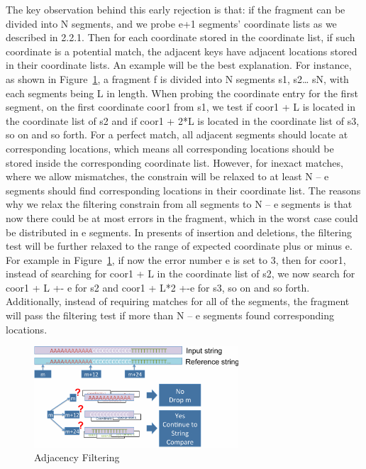 The key observation behind this early rejection is that: if the fragment can be
divided into N segments, and we probe e+1 segments’ coordinate lists as we
described in 2.2.1. Then for each coordinate stored in the coordinate list, if
such coordinate is a potential match, the adjacent keys have adjacent locations
stored in their coordinate lists. An example will be the best explanation. For
instance, as shown in Figure~\ref{fig:ad_filtering}, a fragment f is divided into
N segments s1, s2… sN, with each segments being L in length. When probing the
coordinate entry for the first segment, on the first coordinate coor1 from s1,
we test if coor1 + L is located in the coordinate list of s2 and if coor1 + 2*L
is located in the coordinate list of s3, so on and so forth. For a perfect
match, all adjacent segments should locate at corresponding locations, which
means all corresponding locations should be stored inside the corresponding
coordinate list. However, for inexact matches, where we allow mismatches, the
constrain will be relaxed to at least N – e segments should find corresponding
locations in their coordinate list. The reasons why we relax the filtering
constrain from all segments to N – e segments is that now there could be at
most errors in the fragment, which in the worst case could be distributed in e
segments. In presents of insertion and deletions, the filtering test will be
further relaxed to the range of expected coordinate plus or minus e. For
example in Figure~\ref{fig:ad_filtering}, if now the error number e is set to 3,
then for coor1, instead of searching for coor1 + L in the coordinate list of
s2, we now search for coor1 + L +- e for s2 and coor1 + L*2 +-e for s3, so on
and so forth.  Additionally, instead of requiring matches for all of the
segments, the fragment will pass the filtering test if more than N – e segments
found corresponding locations. \\

\begin{figure}[t] 
\centering
\vspace{0.1in}
\includegraphics[width=3in]{./figure/Adjacency_Filtering_B.pdf} \vspace{0in}
\caption{Adjacency Filtering}
\label{fig:ad_filtering} 
\end{figure}

